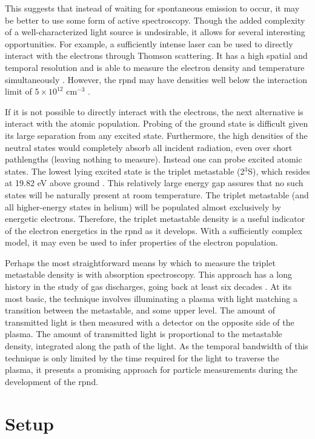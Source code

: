 This suggests that instead of waiting for spontaneous emission to occur, it may
be better to use some form of active spectroscopy. Though the added complexity
of a well-characterized light source is undesirable, it allows for several
interesting opportunities. For example, a sufficiently intense laser can be used
to directly interact with the electrons through Thomson scattering. It has a
high spatial and temporal resolution and is able to measure the electron density
and temperature simultaneously \cite{VanGessel2012}. However, the \acs{rpnd} may
have densities well below the interaction limit of $5\times10^{12}$ cm$^{-3}$
\cite{Pai2009}.

If it is not possible to directly interact with the electrons, the next
alternative is interact with the atomic population. Probing of the ground state
is difficult given its large separation from any excited state. Furthermore, the
high densities of the neutral states would completely absorb all incident
radiation, even over short pathlengths (leaving nothing to measure). Instead one
can probe excited atomic states. The lowest lying excited state is the triplet
metastable (2$^3$S), which resides at 19.82 eV above ground \cite{Kramida2012}.
This relatively large energy gap assures that no such states will be naturally
present at room temperature. The triplet metastable (and all higher-energy
states in helium) will be populated almost exclusively by energetic electrons.
Therefore, the triplet metastable density is a useful indicator of the electron
energetics in the \acs{rpnd} as it develops. With a sufficiently complex model,
it may even be used to infer properties of the electron population.

Perhaps the most straightforward means by which to measure the triplet
metastable density is with absorption spectroscopy. This approach has a long
history in the study of gas discharges, going back at least six decades
\cite{Phelps1953}. At its most basic, the technique involves illuminating a
plasma with light matching a transition between the metastable, and some upper
level. The amount of transmitted light is then measured with a detector on the
opposite side of the plasma. The amount of transmitted light is proportional to
the metastable density, integrated along the path of the light. As the temporal
bandwidth of this technique is only limited by the time required for the light
to traverse the plasma, it presents a promising approach for particle
measurements during the development of the \acs{rpnd}.

\section{Setup}

